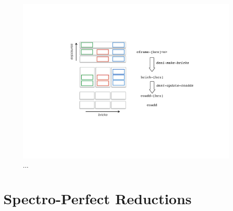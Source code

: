 \documentclass[12pt]{article}
\begin{document}
\begin{figure}[htb]
\begin{center}
\includegraphics[width=5in]{fig/dataflow}
\caption{...}
\label{fig:dataflow}
\end{center}
\end{figure}

\section{Spectro-Perfect Reductions}
\end{document}
